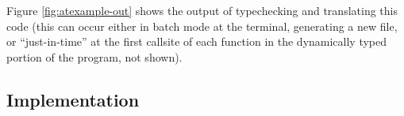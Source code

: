 \documentclass[9pt]{sig-alternate}
\theoremstyle{definition}
\begin{document}

Figure \ref{fig:atexample-out} shows the output of typechecking and translating this code (this can occur either in batch mode at the terminal, generating a new file, or ``just-in-time'' at the first callsite of each function in the dynamically typed portion of the program, not shown). 

\subsection{Implementation}
\end{document}
